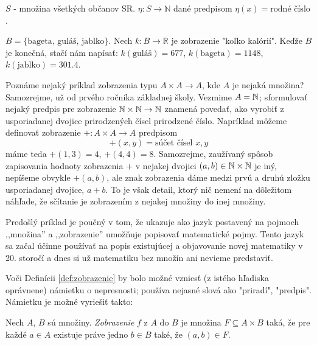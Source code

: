 \begin{example}
$S$ - množina všetkých občanov SR.
$\eta \colon S \rightarrow \mathbb{N}$ dané predpisom $\eta(x) = \text{rodné číslo}$.
\end{example}

\begin{example}
$B = \{\text{bageta, guláš, jablko}\}$. Nech $k \colon B \rightarrow \mathbb{R}$ je zobrazenie "koľko kalórií".
Keďže $B$ je konečná, stačí nám napísať:
$k(\text{guláš}) = 677$, $k(\text{bageta}) = 1148$, $k(\text{jablko}) = 301.4$.
\end{example}

\begin{example}
Poznáme nejaký príklad zobrazenia typu $A\times A\to A$, kde $A$ je nejaká množina? Samozrejme, už od prvého ročníka
základnej školy. Vezmime $A=\mathbb{N}$; sformulovať nejaký predpis pre zobrazenie 
$\mathbb{N}\times\mathbb{N}\to\mathbb{N}$ znamená povedať, ako vyrobiť z usporiadanej dvojice prirodzených čísel prirodzené
číslo. Napríklad môžeme definovať zobrazenie $+\colon A\times A\to A$ predpisom
\[
+(x,y)=\text{súčet čísel $x,y$}
\]
máme teda $+(1,3)=4$, $+(4,4)=8$. Samozrejme, zaužívaný spôsob zapisovania hodnoty zobrazenia $+$ v nejakej dvojici
$(a,b)\in\mathbb{N}\times\mathbb{N}$ je iný, nepíšeme obvykle $+(a,b)$, ale znak zobrazenia dáme medzi prvú a druhú zložku
usporiadanej dvojice, $a+b$. To je však detail, ktorý nič nemení na dôležitom náhľade, že sčítanie je zobrazením
z nejakej množiny do inej množiny.
\end{example}

Predošlý príklad je poučný v tom, že ukazuje ako jazyk postavený na pojmoch ,,množina'' a ,,zobrazenie'' umožňuje
popisovať matematické pojmy. Tento jazyk sa začal účinne používať na popis existujúcej a objavovanie novej matematiky v
20. storočí a dnes si už matematiku bez množín ani nevieme predstaviť.

Voči Definícii \ref{def:zobrazenie} by bolo možné vzniesť (z istého hľadiska oprávnene) námietku o nepresnosti; používa nejasné slová ako
"priradí", "predpis".
Námietku je možné vyriešiť takto:

\begin{definition}\label{def:zobrazenieFormal}
Nech $A$, $B$ sú množiny.
\emph{Zobrazenie} $f$ z $A$ do $B$ je množina $F \subseteq A \times B$ taká, že pre každé $a \in A$ existuje práve jedno $b \in B$ také, že $(a,b) \in F$.
\end{definition}

